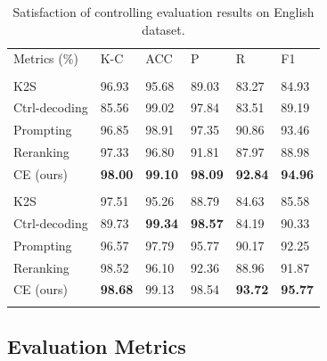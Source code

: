 \documentclass[11pt]{article}
\begin{document}
\begin{table}[t]
	\small
	\centering
	\renewcommand\arraystretch{1.2}
    \begin{tabular}{L{1.8cm}|C{0.7cm}|C{0.6cm}|C{0.6cm}|C{0.6cm}|C{0.6cm}}
	\Xhline{1pt}
	Metrics (\%) & K-C & ACC & P & R & F1 \\
	\Xhline{1pt}
	 \\
	\hline
	K2S & 96.93 & 95.68 & 89.03 & 83.27 & 84.93 \\
	\hline
	Ctrl-decoding & 85.56 & 99.02 & 97.84 & 83.51 & 89.19 \\
	Prompting & 96.85 & 98.91 & 97.35 & 90.86 & 93.46 \\
	Reranking & 97.33 & 96.80 & 91.81 & 87.97 & 88.98 \\
	\hline
	CE (ours) & \textbf{98.00} & \textbf{99.10} & \textbf{98.09} & \textbf{92.84} & \textbf{94.96} \\
	\Xhline{1pt}
	 \\
	\hline
	K2S & 97.51 & 95.26 & 88.79 & 84.63 & 85.58 \\
	\hline
	Ctrl-decoding & 89.73 & \textbf{99.34} & \textbf{98.57} & 84.19 & 90.33 \\
	Prompting & 96.57 & 97.79 & 95.77 & 90.17 & 92.25 \\
	Reranking & 98.52 & 96.10 & 92.36 & 88.96 & 91.87 \\
	\hline
	CE (ours) & \textbf{98.68} & 99.13 & 98.54 & \textbf{93.72} & \textbf{95.77} \\
	\Xhline{1pt}
	\end{tabular}
	\caption{Satisfaction of controlling evaluation results on English dataset.}
	\label{table4}
\end{table}

\subsection{Evaluation Metrics}
\end{document}
